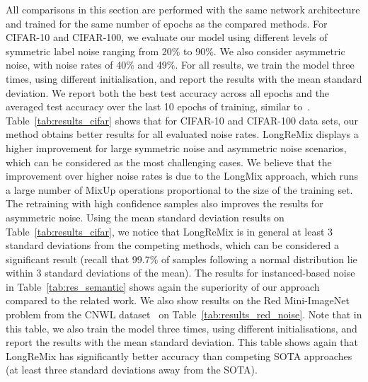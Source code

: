 \documentclass[review]{elsarticle}
\begin{document}
\begin{table}[t]
\footnotesize
\centering
{}
\caption{Results for Food-101N~\cite{lee2018cleannet}. Methods marked by * denote re-implementations based on public code.}
\label{tab:res_food}
\end{table}


All comparisons in this section are performed with the same network architecture and trained for the same number of epochs as the compared methods.
For CIFAR-10 and CIFAR-100, we evaluate our model using different levels of symmetric label noise ranging from 20\% to 90\%. We also consider asymmetric noise, with noise rates of 40\% and 49\%. 
For all results, we train the model three times, using different initialisation, and report the results with the mean  standard deviation.
We report both the best test accuracy across all epochs and the averaged test accuracy over the last 10 epochs of training, similar to~\cite{li2020dividemix}. Table~\ref{tab:results_cifar} shows that for CIFAR-10 and CIFAR-100 data sets, our method obtains better results for all evaluated noise rates. LongReMix displays a higher improvement for large symmetric noise and asymmetric noise scenarios, which can be considered as the most challenging cases. We believe that the improvement over higher noise rates is due to the LongMix approach, which runs a large number of MixUp operations proportional to the size of the training set. The retraining with high confidence samples also improves the results for asymmetric noise. 
Using the mean  standard deviation results on Table~\ref{tab:results_cifar}, 
we notice that LongReMix is in general at least 3 standard deviations from the competing methods, which can be considered a significant result (recall that 99.7\% of samples following a normal distribution lie within 3 standard deviations of the mean).
The results for instanced-based noise~\cite{rog} in
Table~\ref{tab:res_semantic} shows again the superiority of our approach compared to the related work.
We also show results on the Red Mini-ImageNet problem from the CNWL dataset~\cite{jiang2020beyond,FaMUS} on Table~\ref{tab:results_red_noise}. Note that in this table, we also train the model three times, using different initialisations, and report the results with the mean  standard deviation.
This table shows again that LongReMix has significantly better accuracy than competing SOTA approaches (at least three standard deviations away from the SOTA).
\end{document}
